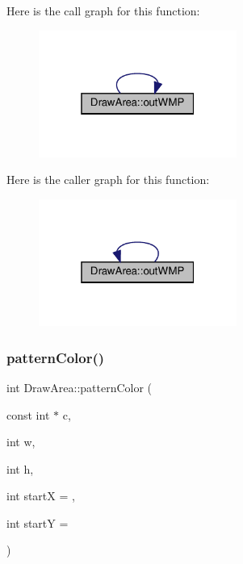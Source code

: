 Here is the call graph for this function\+:
\nopagebreak
\begin{figure}[H]
\begin{center}
\leavevmode
\includegraphics[width=184pt]{class_draw_area_aca33765930d4a4c76bbf476b8580e171_cgraph}
\end{center}
\end{figure}
Here is the caller graph for this function\+:
\nopagebreak
\begin{figure}[H]
\begin{center}
\leavevmode
\includegraphics[width=184pt]{class_draw_area_aca33765930d4a4c76bbf476b8580e171_icgraph}
\end{center}
\end{figure}
\mbox{\label{class_draw_area_aa0d040fe268e6da6cc7085057a30d5d1}} 
\subsubsection{\texorpdfstring{pattern\+Color()}{patternColor()}\hspace{0.1cm}{\footnotesize\ttfamily [1/3]}}
{\footnotesize\ttfamily int Draw\+Area\+::pattern\+Color (\begin{DoxyParamCaption}\item[{const int $\ast$}]{c,  }\item[{int}]{w,  }\item[{int}]{h,  }\item[{int}]{startX = {},  }\item[{int}]{startY = {} }\end{DoxyParamCaption})\hspace{0.3cm}{\ttfamily [inline]}}




